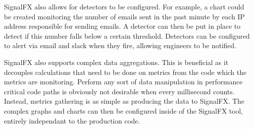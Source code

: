 SignalFX also allows for detectors to be configured. For example, a chart could be created monitoring the number of emails sent in the past minute by each IP address responsible for sending emails. A detector can then be put in place to detect if this number falls below a certain threshold. Detectors can be configured to alert via email and slack when they fire, allowing engineers to be notified. 

SignalFX also supports complex data aggregations. This is beneficial as it decouples calculations that need to be done on metrics from the code which the metrics are monitoring. Perform any sort of data manipulation in performance critical code paths is obviously not desirable when every millisecond counts. Instead, metrics gathering is as simple as producing the data to SignalFX. The complex graphs and charts can then be configured inside of the SignalFX tool, entirely independant to the production code. 